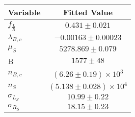 \begin{tabular}[t]{lc}
\hline
Variable &Fitted Value\\
\hline\hline
$f_{\frac{L}{R}}$&$0.431\pm0.021$\\
\hline
$\lambda_{B,c}$&$-0.00163\pm0.00023$\\
\hline
$\mu_S$&$5278.869\pm0.079$\\
\hline
B&$1577\pm48$\\
\hline
$n_{B,c}$&$(6.26\pm0.19)\times 10^3$\\
\hline
$n_S$&$(5.138\pm0.028)\times 10^4$\\
\hline
$\sigma_{L_S}$&$10.99\pm0.22$\\
\hline
$\sigma_{R_S}$&$18.15\pm0.23$\\
\hline
\end{tabular}